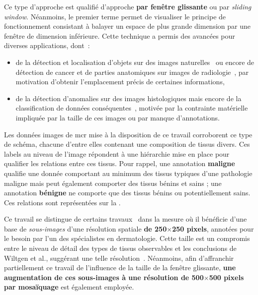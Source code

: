 Ce type d'approche est qualifié d'approche \textbf{par fenêtre glissante} ou par \textit{sliding window}. Néanmoins, le premier terme permet de visualiser le principe de fonctionnement consistant à balayer un espace de plus grande dimension par une fenêtre de dimension inférieure. Cette technique a permis des avancées pour diverses applications, dont~: 
\begin{itemize}
    \item de la détection et localisation d'objets sur des images naturelles~\cite{Harzallah2009} ou encore de détection de cancer et de parties anatomiques sur images de radiologie~\cite{Helwan2017}, par motivation d'obtenir l'emplacement précis de certaines informations,
    \item de la détection d'anomalies sur des images histologiques mais encore de la classification de données conséquentes~\cite{Hou2016,Alqudah2019,Wei2019}, motivée par la contrainte matérielle impliquée par la taille de ces images ou par manque d'annotations.
\end{itemize}\par

Les données images de \gls{mcr} mise à la disposition de ce travail corroborent ce type de schéma, chacune d'entre elles contenant une composition de tissus divers. Ces labels au niveau de l'image répondent à une hiérarchie mise en place pour qualifier les relations entre ces tissus. Pour rappel, une annotation \textbf{maligne} qualifie une donnée comportant au minimum des tissus typiques d'une pathologie maligne mais peut également comporter des tissus bénins et sains ; une annotation \textbf{bénigne} ne comporte que des tissus bénins ou potentiellement sains. Ces relations sont représentées sur la .\par

Ce travail se distingue de certains travaux~\cite{Hou2016,Alqudah2019} dans la mesure où il bénéficie d'une base de \textit{sous-images} d'une résolution spatiale \textbf{de 250$\times$250 pixels}, annotées pour le besoin par l'un des spécialistes en dermatologie. Cette taille est un compromis entre le niveau de détail des types de tissus observables et les conclusions de Wiltgen et al., suggérant une telle résolution~\cite{Wiltgen2008}. Néanmoins, afin d'affranchir partiellement ce travail de l'influence de la taille de la fenêtre glissante, \textbf{une augmentation de ces sous-images à une résolution \textbf{de 500$\times$500 pixels} par mosaïquage} est également employée.\par

